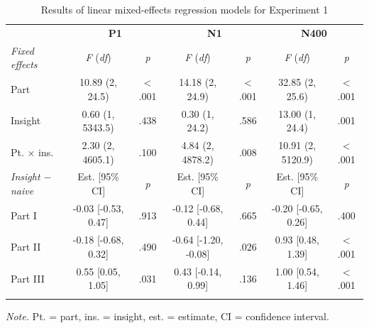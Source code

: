 \documentclass[
  english,
  man,11pt,floatsintext]{apa7}
\begin{document}
\begin{table}[tbp]

\begin{center}
\begin{threeparttable}

\caption{\label{tab:exp1-table}Results of linear mixed-effects regression models for Experiment 1}

\footnotesize{

\begin{tabular}{lcccccc}
\toprule
 & \multicolumn{2}{c}{\textbf{P1}} & \multicolumn{2}{c}{\textbf{N1}} & \multicolumn{2}{c}{\textbf{N400}} \\
\cmidrule(r){2-3} \cmidrule(r){4-5} \cmidrule(r){6-7}
\textit{Fixed effects} & \textit{F} (\textit{df}) & \textit{p} & \textit{F} (\textit{df}) & \textit{p} & \textit{F} (\textit{df}) & \textit{p}\\
\midrule
Part & 10.89 (2, 24.5) & < .001 & 14.18 (2, 24.9) & < .001 & 32.85 (2, 25.6) & < .001\\
Insight & 0.60 (1, 5343.5) & .438 & 0.30 (1, 24.2) & .586 & 13.00 (1, 24.4) & .001\\
Pt. × ins. & 2.30 (2, 4605.1) & .100 & 4.84 (2, 4878.2) & .008 & 10.91 (2, 5120.9) & < .001\\
\textit{Insight $-$  naive} & Est. [95\% CI] & \textit{p} & Est. [95\% CI] & \textit{p} & Est. [95\% CI] & \textit{p}\\ \midrule
Part I & -0.03 [-0.53, 0.47] & .913 & -0.12 [-0.68, 0.44] & .665 & -0.20 [-0.65, 0.26] & .400\\
Part II & -0.18 [-0.68, 0.32] & .490 & -0.64 [-1.20, -0.08] & .026 & 0.93 [0.48, 1.39] & < .001\\
Part III & 0.55 [0.05, 1.05] & .031 & 0.43 [-0.14, 0.99] & .136 & 1.00 [0.54, 1.46] & < .001\\
\bottomrule
\addlinespace
\end{tabular}

}

\begin{tablenotes}[para]
\normalsize{\textit{Note.} Pt. = part, ins. = insight, est. = estimate, CI = confidence interval.}
\end{tablenotes}

\end{threeparttable}
\end{center}

\end{table}
\end{document}
